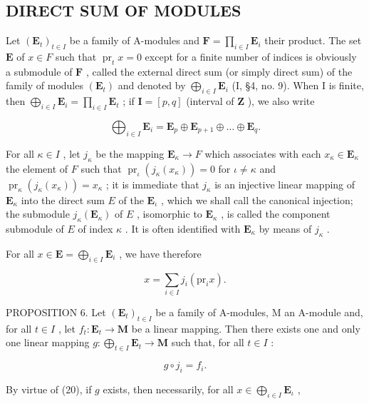 \subsection{DIRECT SUM OF MODULES}

Let \((\mathbf{E}_t)_{t \in I}\) be a family of A-modules and \(\mathbf{F} = \prod_{i \in I} \mathbf{E}_i\) their product. The set \(\mathbf{E}\) of \(x \in F\) such that \(\operatorname{pr}_t x = 0\) except for a finite number of indices is obviously a submodule of \(\mathbf{F}\) , called the external direct sum (or simply direct sum) of the family of modules \((\mathbf{E}_t)\) and denoted by \(\bigoplus_{i \in I} \mathbf{E}_i\) (I, §4, no. 9). When I is finite, then \(\bigoplus_{i \in I} \mathbf{E}_i = \prod_{i \in I} \mathbf{E}_t\) ; if \(\mathbf{I} = [p, q]\) (interval of \(\mathbf{Z}\) ), we also write

\[
\bigoplus_ {i \in I} \mathbf {E} _ {i} = \mathbf {E} _ {p} \oplus \mathbf {E} _ {p + 1} \oplus \dots \oplus \mathbf {E} _ {q}.
\]

For all \(\kappa \in I\) , let \(j_{\kappa}\) be the mapping \(\mathbf{E}_{\kappa} \to F\) which associates with each \(x_{\kappa} \in \mathbf{E}_{\kappa}\) the element of \(F\) such that \(\operatorname{pr}_{\iota}(j_{\kappa}(x_{\kappa})) = 0\) for \(\iota \neq \kappa\) and \(\operatorname{pr}_{\kappa}(j_{\kappa}(x_{\kappa})) = x_{\kappa}\) ; it is immediate that \(j_{\kappa}\) is an injective linear mapping of \(\mathbf{E}_{\kappa}\) into the direct sum \(E\) of the \(\mathbf{E}_{\iota}\) , which we shall call the canonical injection; the submodule \(j_{\kappa}(\mathbf{E}_{\kappa})\) of \(E\) , isomorphic to \(\mathbf{E}_{\kappa}\) , is called the component submodule of \(E\) of index \(\kappa\) . It is often identified with \(\mathbf{E}_{\kappa}\) by means of \(j_{\kappa}\) .

For all \(x \in \mathbf{E} = \bigoplus_{i \in I} \mathbf{E}_i\) , we have therefore

\[
x = \sum_ {i \in I} j _ {i} (\mathrm{pr} _ {i} x).\tag{20}
\]

PROPOSITION 6. Let \((\mathbf{E}_t)_{t \in I}\) be a family of A-modules, M an A-module and, for all \(t \in I\) , let \(f_t: \mathbf{E}_t \to \mathbf{M}\) be a linear mapping. Then there exists one and only one linear mapping \(g: \bigoplus_{t \in I} \mathbf{E}_t \to \mathbf{M}\) such that, for all \(t \in I\) :

\[
g \circ j _ {i} = f _ {i}.\tag{21}
\]

By virtue of (20), if \(g\) exists, then necessarily, for all \(x \in \bigoplus_{\iota \in I} \mathbf{E}_{\iota}\) ,

